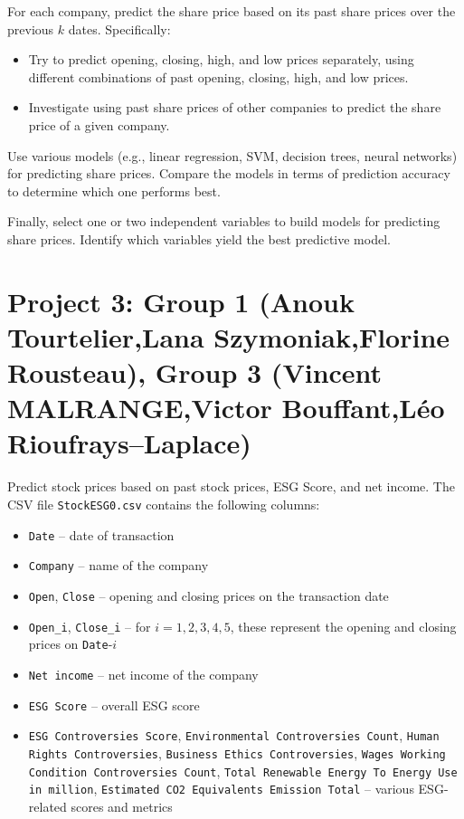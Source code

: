 \documentclass{article}
\begin{document}
For each company, predict the share price based on its past share prices over the previous $k$ dates. Specifically: \begin{itemize} \item Try to predict opening, closing, high, and low prices separately, using different combinations of past opening, closing, high, and low prices. \item Investigate using past share prices of other companies to predict the share price of a given company. \end{itemize}

Use various models (e.g., linear regression, SVM, decision trees, neural networks) for predicting share prices. Compare the models in terms of prediction accuracy to determine which one performs best.

Finally, select one or two independent variables to build models for predicting share prices. Identify which variables yield the best predictive model.

\section*{Project 3: Group 1 (Anouk Tourtelier,Lana Szymoniak,Florine Rousteau), Group 3 (Vincent MALRANGE,Victor Bouffant,Léo Rioufrays--Laplace) }
 Predict stock prices based on past stock prices, ESG Score, and net income. The CSV file \lstinline$StockESG0.csv$ contains the following columns: \begin{itemize} \item \lstinline$Date$ -- date of transaction \item \lstinline$Company$ -- name of the company \item \lstinline$Open$, \lstinline$Close$ -- opening and closing prices on the transaction date \item \lstinline$Open_i$, \lstinline$Close_i$ -- for $i=1,2,3,4,5$, these represent the opening and closing prices on \lstinline$Date$-$i$ \item \lstinline$Net income$ -- net income of the company \item \lstinline$ESG Score$ -- overall ESG score \item \lstinline$ESG Controversies Score$, \lstinline$Environmental Controversies Count$, \lstinline$Human Rights Controversies$, \lstinline$Business Ethics Controversies$, \lstinline$Wages Working Condition Controversies Count$, \lstinline$Total Renewable Energy To Energy Use in million$, \lstinline$Estimated CO2 Equivalents Emission Total$ -- various ESG-related scores and metrics \end{itemize}
\end{document}

